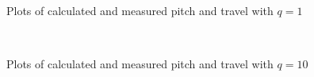 \begin{figure}
    \centering
    \begin{subfigure}[t]{0.5\textwidth}
        
        \label{fig:2_travel_q1}
    \end{subfigure}%
    ~
    \begin{subfigure}[t]{0.5\textwidth}
        
        \label{fig:2_pitch_q1}
    \end{subfigure}\vspace{-0.4cm}
    \caption{Plots of calculated and measured pitch and travel with $q = 1$}\label{fig:2_plots_q1}
\end{figure}

\begin{figure}
    \centering
    \begin{subfigure}[t]{0.5\textwidth}
        
        \label{fig:2_travel_q10}
    \end{subfigure}%
    ~
    \begin{subfigure}[t]{0.5\textwidth}
        
        \label{fig:2_pitch_q10}
    \end{subfigure}\vspace{-0.4cm}
    \caption{Plots of calculated and measured pitch and travel with $q = 10$}\label{fig:2_plots_q10}
\end{figure}
